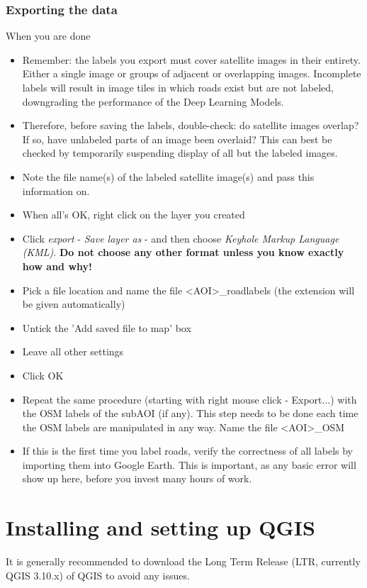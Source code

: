 \documentclass[12pt,a4paper]{scrartcl}
\begin{document}
\subsubsection{Exporting the data}
When you are done 
\begin{itemize}
	\item Remember: the labels you export must cover satellite images in their entirety. Either a single image or groups of adjacent or overlapping images. Incomplete labels will result in image tiles in which roads exist but are not labeled, downgrading the performance of the Deep Learning Models. 
	\item Therefore, before saving the labels, double-check: do satellite images overlap? If so, have unlabeled parts of an image been overlaid? This can best be checked by temporarily suspending display of all but the labeled images.
	\item Note the file name(s) of the labeled satellite image(s) and pass this information on.
	\item When all's OK, right click on the layer you created
	\item Click  \textit{export} - \textit{Save layer as} - and then choose \textit{Keyhole Markup Language (KML)}. \textbf{Do not choose any other format unless you know exactly how and why!}
	\item Pick a file location and name the file <AOI>\_roadlabels (the extension will be given automatically)
	\item Untick the 'Add saved file to map' box
	\item Leave all other settings
	\item Click OK
	\item Repeat the same procedure (starting with right mouse click - Export...) with the OSM labels of the subAOI (if any). This step needs to be done each time the OSM labels are manipulated in any way. Name the file <AOI>\_OSM
	\item If this is the first time you label roads, verify the correctness of all labels by importing them into Google Earth. This is important, as any basic error will show up here, before you invest many hours of work.
\end{itemize}


\section{Installing and setting up QGIS}
\label{sec:qgis_install}
It is generally recommended to download the Long Term Release (LTR, currently QGIS 3.10.x) of QGIS to avoid any issues. \newline
\end{document}
